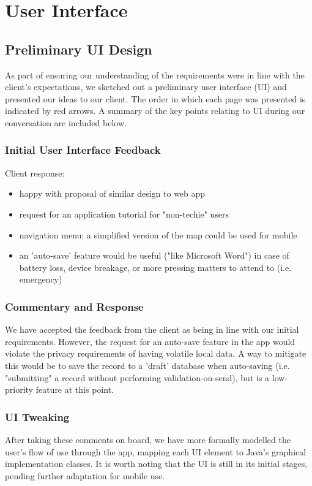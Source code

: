 \documentclass[12pt,a4paper,oneside,titlepage]{article}
\begin{document}
\newpage
\section{User Interface}
\subsection{Preliminary UI Design}
As part of ensuring our understanding of the requirements were in line with the client's expectations, we sketched out a preliminary user interface (UI) and presented our ideas to our client. The order in which each page was presented is indicated by red arrows. A summary of the key points relating to UI during our conversation are included below.

\subsubsection{Initial User Interface Feedback}
Client response:
\begin{itemize}
	\item happy with proposal of similar design to web app
	\item request for an application tutorial for "non-techie" users
	\item navigation menu: a simplified version of the map could be used for mobile
	\item an 'auto-save' feature would be useful ("like Microsoft Word") in case of battery loss, device breakage, or more pressing matters to attend to (i.e. emergency)
\end{itemize}
\subsubsection{Commentary and Response}
We have accepted the feedback from the client as being in line with our initial requirements. However, the request for an auto-save feature in the app would violate the privacy requirements of having volatile local data. A way to mitigate this would be to save the record to a 'draft' database when auto-saving (i.e. "submitting" a record without performing validation-on-send), but is a low-priority feature at this point.
\subsubsection{UI Tweaking}
After taking these comments on board, we have more formally modelled the user's flow of use through the app, mapping each UI element to Java's graphical implementation classes. It is worth noting that the UI is still in its initial stages, pending further adaptation for mobile use.
\end{document}
